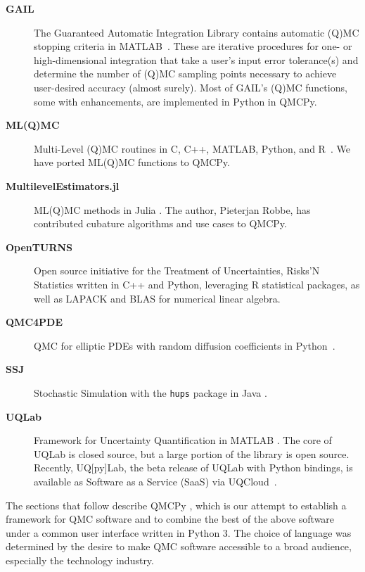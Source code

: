 \documentclass[graybox]{svmult}
\begin{document}
\begin{description}%
	\item[\textbf{GAIL}] The Guaranteed Automatic Integration Library  contains automatic (Q)MC stopping criteria in MATLAB~\cite{ChoEtal21a,HCJJ14}. These are iterative procedures for one- or high-dimensional integration that take a user's input error tolerance(s) and determine the number of (Q)MC sampling points necessary to achieve user-desired accuracy (almost surely).  Most of GAIL's (Q)MC functions, some with enhancements, are implemented in Python in QMCPy.
	\item[\textbf{ML(Q)MC}] Multi-Level (Q)MC routines in C, C++, MATLAB, Python, and R~\cite{GilesSoft}. We have ported ML(Q)MC functions to QMCPy.
	\item[\textbf{MultilevelEstimators.jl}] ML(Q)MC methods in Julia \cite{Rob21}. The author, Pieterjan Robbe, has contributed cubature algorithms and use cases to QMCPy.
	\item[\textbf{OpenTURNS}] Open source initiative for the Treatment of Uncertainties, Risks'N Statistics \cite{OpenTURNS} written in C++ and Python, leveraging R statistical packages, as well as LAPACK and BLAS for numerical linear algebra.
	\item[\textbf{QMC4PDE}] \sloppypar QMC for elliptic PDEs with random diffusion coefficients in Python~\cite{KuoNuy16a}.
	\item[\textbf{SSJ}] Stochastic Simulation with the \texttt{hups} package in Java \cite{SSJ}.
	\item[\textbf{UQLab}] Framework for Uncertainty Quantification in MATLAB \cite{UQLab2014}.  The core of UQLab is closed source, but a large portion of the library is open source. Recently,  UQ[py]Lab, the beta release of UQLab with Python bindings, is  available as Software as a Service (SaaS) via UQCloud~\cite{lataniotis2021uncertainty}.

\end{description}

The sections that follow describe QMCPy \cite{QMCPy2020a}, which is our attempt to establish a framework for QMC software and to combine the best of the above software under a common user interface written in Python 3.  The choice of language was determined by the desire to make QMC software accessible to a broad audience, especially the technology industry.
\end{document}
